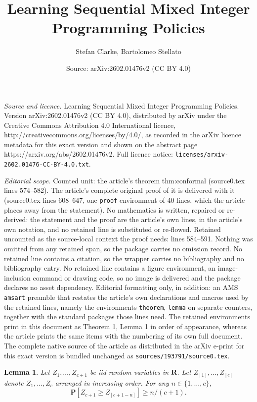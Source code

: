 \documentclass[10pt,a4paper]{amsart}
\title{Learning Sequential Mixed Integer Programming Policies}
\author{Stefan Clarke, Bartolomeo Stellato}
\date{Source: arXiv:2602.01476v2 (CC BY 4.0)}
\newtheorem{lemma}{Lemma}
\newcommand{\Prob}{\mathbf{P}}
\newcommand{\ncalib}{c}
\newcommand{\reals}{\mathbf{R}}
\begin{document}
\maketitle

\noindent\emph{Source and licence.} Learning Sequential Mixed Integer Programming Policies. Version arXiv:2602.01476v2 (CC BY 4.0), distributed by arXiv under the Creative Commons Attribution 4.0 International licence, http://creativecommons.org/licenses/by/4.0/, as recorded in the arXiv licence metadata for this exact version and shown on the abstract page https://arxiv.org/abs/2602.01476v2. Full licence notice: \texttt{licenses/arxiv-2602.01476-CC-BY-4.0.txt}.\par\smallskip

\noindent\textit{Editorial scope.} Counted unit: the article's theorem thm:conformal (source0.tex lines 574--582). The article's complete original proof of it is delivered with it (source0.tex lines 608--647, one \texttt{proof} environment of 40 lines, which the article places away from the statement). No mathematics is written, repaired or re-derived: the statement and the proof are the article's own lines, in the article's own notation, and no retained line is substituted or re-flowed.  Retained uncounted as the source-local context the proof needs: lines 584--591.  Nothing was omitted from any retained span, so the package carries no omission record.  No retained line contains a citation, so the wrapper carries no bibliography and no bibliography entry.  No retained line contains a figure environment, an image-inclusion command or drawing code, so no image is delivered and the package declares no asset dependency.  Editorial formatting only, in addition: an AMS \texttt{amsart} preamble that restates the article's own declarations and macros used by the retained lines, namely the environments \texttt{theorem}, \texttt{lemma} on separate counters, together with the standard packages those lines need.  The retained environments print in this document as Theorem 1, Lemma 1 in order of appearance, whereas the article prints the same items with the numbering of its own full document.  The complete native source of the article as distributed in the arXiv e-print for this exact version is bundled unchanged as \texttt{sources/193791/source0.tex}.
\begin{lemma} \label{lemma:ordering}
    Let $Z_1, \dots, Z_{\ncalib + 1}$ be iid random variables in $\reals$.
    Let $Z_{[1]}, \dots, Z_{[\ncalib]}$ denote $Z_1, \dots, Z_\ncalib$ arranged in increasing order.
    For any $n \in \{1, \dots, \ncalib\}$,
    $$
    \Prob[Z_{\ncalib + 1} \ge Z_{[\ncalib + 1 - n]}] \ge n / (\ncalib + 1).
    $$
\end{lemma}
\end{document}
